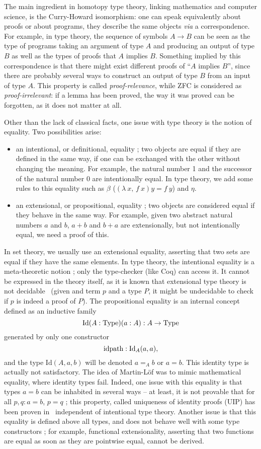 The main ingredient in homotopy type theory, linking mathematics and
computer science, is the Curry-Howard isomorphism: one can speak
equivalently about proofs or about programs, they describe the same
objects {\em via} a correspondence. For example, in type theory, the
sequence of symbols $A\to B$ can be seen as the type of programs
taking an argument of type $A$ and producing an output of type $B$ as
well as the types of proofs that $A$ implies $B$. Something implied by
this correspondence is that there might exist different proofs of
``$A$ implies $B$'', since there are probably several ways to
construct an output of type $B$ from an input of type $A$. This
property is called {\em proof-relevance}, while ZFC is considered as
{\em proof-irrelevant}: if a lemma has been proved, the way it was
proved can be forgotten, as it does not matter at all.

Other than the lack of classical facts, one issue with type theory is
the notion of equality. Two possibilities arise:
\begin{itemize}
\item an intentional, or definitional, equality ; two objects are
equal if they are defined in the same way, \ie{} if one can be
exchanged with the other without changing the meaning. For example,
the natural number 1 and the successor of the natural number 0 are
intentionally equal. In type theory, we add some rules to this
equality such as $\beta$ ($(\lambda\ x,\,f\ x)y = f\ y$) and $\eta$.
\item an extensional, or propositional, equality ; two objects are
considered equal if they behave in the same way. For example, given
two abstract natural numbers $a$ and $b$, $a+b$ and $b+a$ are
extensionally, but not intentionally equal, \ie{} we need a proof of
this.
\end{itemize} In set theory, we usually use an extensional equality,
asserting that two sets are equal if they have the same elements. In
type theory, the intentional equality is a meta-theoretic notion ;
only the type-checker (like Coq) can access it. It cannot be expressed
in the theory itself, as it is known that extensional type theory is
not decidable~\cite{hofmann1995extensional} (given and term $p$ and a
type $P$, it might be undecidable to check if $p$ is indeed a proof of
$P$). The propositional equality is an internal concept defined as an
inductive family
\[ \mathrm{Id} (A:\operatorname{Type}) (a:A) : A \to \operatorname{Type}
\] generated by only one constructor
\[ \mathrm{idpath} : \mathrm{Id}_A(a,a),
\] and the type $\mathrm{Id}(A,a,b)$ will be denoted $a=_Ab$ or $a=b$.
This identity type is actually not satisfactory. The idea of
Martin-Löf was to mimic mathematical equality, where identity types
fail. Indeed, one issue with this equality is that types $a=b$ can be
inhabited in several ways -- at least, it is not provable that for all
$p,q:a=b$, $p=q$ ; this property, called uniqueness of identity proofs
(UIP) has been proven in~\cite{Hofmann96thegroupoid} independent of
intentional type theory.  Another issue is that this equality is
defined above all types, and does not behave well with some type
constructors ; for example, functional extensionality, asserting that
two functions are equal as soon as they are pointwise equal, cannot be
derived.

